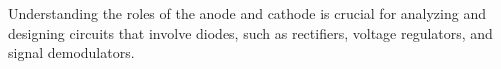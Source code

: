 Understanding the roles of the anode and cathode is crucial for analyzing and designing circuits that involve diodes, such as rectifiers, voltage regulators, and signal demodulators.

